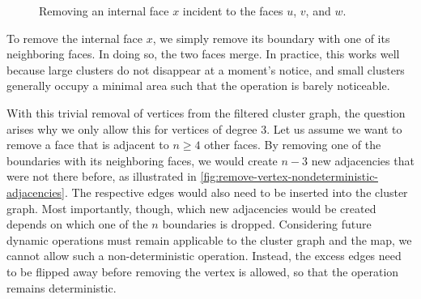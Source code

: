 \begin{figure}[H]
	\centering
	\quad
	\caption{Removing an internal face $x$ incident to the faces $u$, $v$, and $w$.}
	\label{fig:remove-vertex-illustration}
\end{figure}

To remove the internal face $x$, we simply remove its boundary with one of its neighboring faces.
In doing so, the two faces merge.
In practice, this works well because large clusters do not disappear at a moment's notice, and small clusters generally occupy a minimal area such that the operation is barely noticeable.

With this trivial removal of vertices from the filtered cluster graph, the question arises why we only allow this for vertices of degree 3.
Let us assume we want to remove a face that is adjacent to $n \geq 4$ other faces.
By removing one of the boundaries with its neighboring faces, we would create $n - 3$ new adjacencies that were not there before, as illustrated in \cref{fig:remove-vertex-nondeterministic-adjacencies}.
The respective edges would also need to be inserted into the cluster graph.
Most importantly, though, which new adjacencies would be created depends on which one of the $n$ boundaries is dropped.
Considering future dynamic operations must remain applicable to the cluster graph and the map, we cannot allow such a non-deterministic operation.
Instead, the excess edges need to be flipped away before removing the vertex is allowed, so that the operation remains deterministic.

